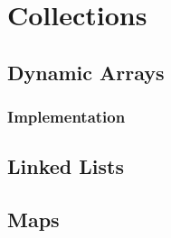 \chapter{Collections}

\section{Dynamic Arrays}






\subsection{Implementation}

\csharpsubsection{\csharp}

\section{Linked Lists}
\csharpsubsection{\csharp}

\section{Maps}





